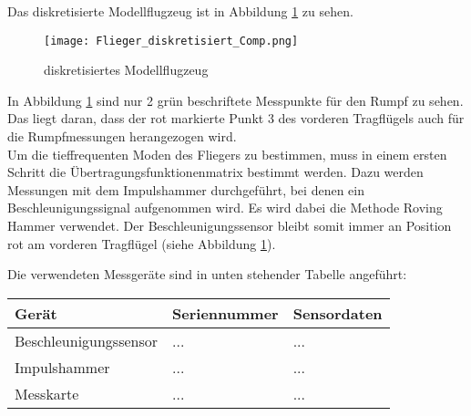     \noindent
    Das diskretisierte Modellflugzeug ist in Abbildung
    \ref{fig: Flieger_diskretisiert} zu sehen.

    \begin{figure}[H]
        \centering
        \texttt{[image: Flieger\_diskretisiert\_Comp.png]}
        \caption{diskretisiertes Modellflugzeug}
        \label{fig: Flieger_diskretisiert}
    \end{figure}

    \noindent
    In Abbildung \ref{fig: Flieger_diskretisiert} sind nur 2 grün beschriftete
    Messpunkte für den Rumpf zu sehen. Das liegt daran, dass der rot markierte
    Punkt 3 des vorderen Tragflügels auch für die Rumpfmessungen herangezogen
    wird.
    \\

    \noindent
    Um die tieffrequenten Moden des Fliegers zu bestimmen, muss in einem ersten
    Schritt die Übertragungsfunktionenmatrix bestimmt werden. Dazu werden
    Messungen mit dem Impulshammer durchgeführt, bei denen ein
    Beschleunigungssignal aufgenommen wird. Es wird dabei die Methode Roving
    Hammer verwendet. Der Beschleunigungssensor bleibt somit immer an Position
     rot\grqq \hspace{0.05cm} am vorderen Tragflügel (siehe Abbildung
    \ref{fig: Flieger_diskretisiert}).

    \noindent
    Die verwendeten Messgeräte sind in unten stehender Tabelle angeführt:

    \begin{table}[H]
        \centering
        \begin{tabular}{|l|l|l|}
            \hline
            \textbf{Gerät}  &   \textbf{Seriennummer}   &   \textbf{Sensordaten} \\
            \hline \hline
            Beschleunigungssensor & ... & ... \\
            \hline
            Impulshammer & ... & ... \\
            \hline
            Messkarte & ... & ... \\
            \hline
        \end{tabular}
    \end{table}    

